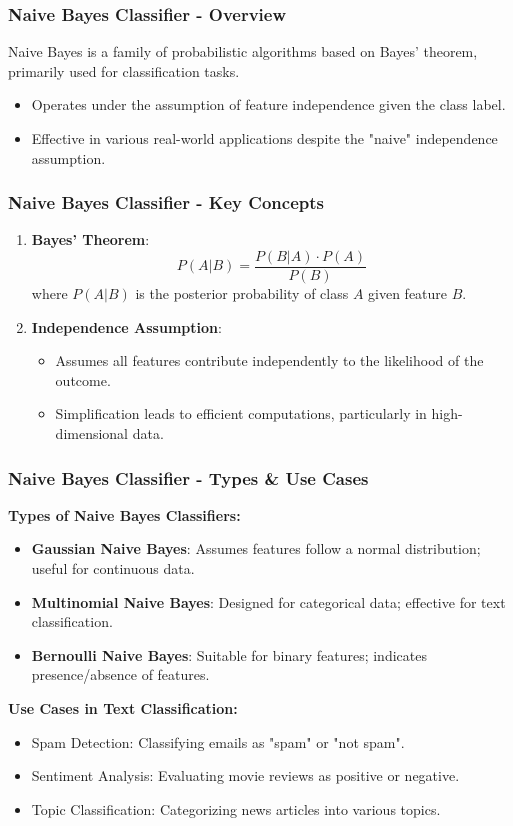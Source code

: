 \documentclass[aspectratio=169]{beamer}
\begin{document}
\begin{frame}[fragile]
  \frametitle{Naive Bayes Classifier - Overview}
  Naive Bayes is a family of probabilistic algorithms based on Bayes' theorem, primarily used for classification tasks. 
  \begin{itemize}
      \item Operates under the assumption of feature independence given the class label.
      \item Effective in various real-world applications despite the "naive" independence assumption.
  \end{itemize}
\end{frame}

\begin{frame}[fragile]
  \frametitle{Naive Bayes Classifier - Key Concepts}
  \begin{enumerate}
      \item \textbf{Bayes' Theorem}:
        \begin{equation}
        P(A|B) = \frac{P(B|A) \cdot P(A)}{P(B)}
        \end{equation}
        where \( P(A|B) \) is the posterior probability of class \( A \) given feature \( B \).
      
      \item \textbf{Independence Assumption}:
        \begin{itemize}
            \item Assumes all features contribute independently to the likelihood of the outcome.
            \item Simplification leads to efficient computations, particularly in high-dimensional data.
        \end{itemize}
  \end{enumerate}
\end{frame}

\begin{frame}[fragile]
  \frametitle{Naive Bayes Classifier - Types & Use Cases}
  \textbf{Types of Naive Bayes Classifiers:}
  \begin{itemize}
      \item \textbf{Gaussian Naive Bayes}: Assumes features follow a normal distribution; useful for continuous data.
      \item \textbf{Multinomial Naive Bayes}: Designed for categorical data; effective for text classification.
      \item \textbf{Bernoulli Naive Bayes}: Suitable for binary features; indicates presence/absence of features.
  \end{itemize}
  
  \textbf{Use Cases in Text Classification:}
  \begin{itemize}
      \item Spam Detection: Classifying emails as "spam" or "not spam".
      \item Sentiment Analysis: Evaluating movie reviews as positive or negative.
      \item Topic Classification: Categorizing news articles into various topics.
  \end{itemize}
\end{frame}
\end{document}
